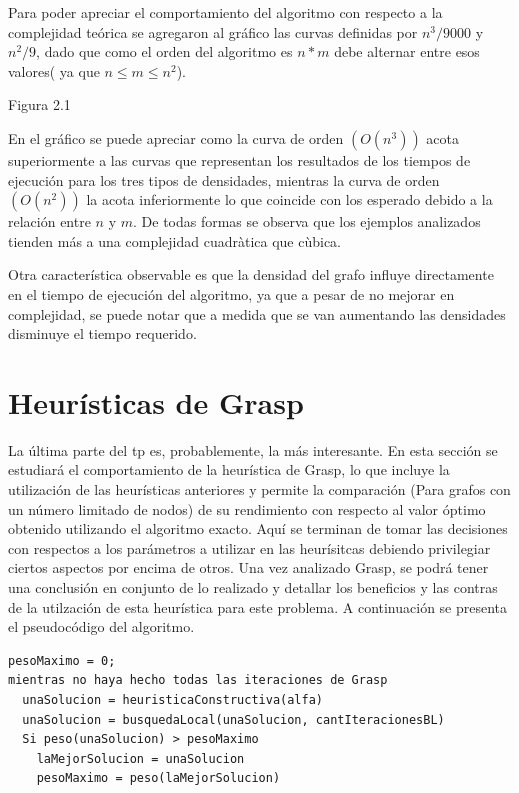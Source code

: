 \documentclass[a4paper,11pt] {article}
\begin{document}
Para poder apreciar el comportamiento del algoritmo con respecto a la complejidad teórica se agregaron al gráfico las curvas definidas por $n^3/9000$ y $n^2/9$, dado que como el orden del algoritmo es $n * m$ debe alternar entre esos valores( ya que $n \leq m \leq n^2$).

\begin{center}
\begin{center}
Figura 2.1
\end{center}
\end{center}

En el gráfico se puede apreciar como la curva de orden $(O(n^3))$ acota superiormente a las curvas que representan los resultados de los tiempos de ejecución para los tres tipos de densidades, mientras la curva de orden $(O(n^2))$ la acota inferiormente lo que coincide con los esperado debido a la relación entre $n$ y $m$. De todas formas se observa que los ejemplos analizados tienden más a una complejidad cuadràtica que cùbica.

Otra característica observable es que la densidad del grafo influye directamente en el tiempo de ejecución del algoritmo, ya que a pesar de no mejorar en complejidad, se puede notar que a medida que se van aumentando las 
densidades disminuye el tiempo requerido. 



\section{Heur\'isticas de Grasp}

La última parte del tp es, probablemente, la más interesante. En esta sección se estudiará el comportamiento de la heurística de Grasp, lo que incluye la utilización de las heurísticas anteriores y permite la comparación (Para grafos con un número limitado de nodos) de su rendimiento con respecto al valor óptimo obtenido utilizando el algoritmo exacto. Aquí se terminan de tomar las decisiones con respectos a los parámetros a utilizar en las heurísitcas debiendo privilegiar ciertos aspectos por encima de otros. Una vez analizado Grasp, se podrá tener una conclusión en conjunto de lo realizado y detallar los beneficios y las contras de la utilzación de esta heurística para este problema.
A continuación se presenta el pseudocódigo del algoritmo.

\begin{verbatim}
pesoMaximo = 0;
mientras no haya hecho todas las iteraciones de Grasp
  unaSolucion = heuristicaConstructiva(alfa)
  unaSolucion = busquedaLocal(unaSolucion, cantIteracionesBL)
  Si peso(unaSolucion) > pesoMaximo
    laMejorSolucion = unaSolucion
    pesoMaximo = peso(laMejorSolucion)

\end{verbatim}
\end{document}
